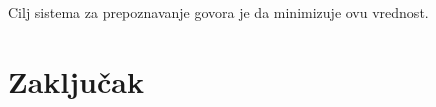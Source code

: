 \documentclass[a4paper]{article}
\newtheorem{primer}{Primer}[section]
\begin{document}
Cilj sistema za prepoznavanje govora je da minimizuje ovu vrednost.

\section{Zaključak}
\label{sec:zakljucak}







\end{document}
